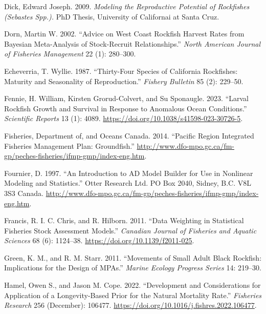 \documentclass[11pt,
  english,
  letterpaper,
]{article}
\newlength{\cslhangindent}
\newenvironment{CSLReferences}[2] %
 {%
  \setlength{\parindent}{0pt}
  \ifodd #1 \everypar{\setlength{\hangindent}{\cslhangindent}}\ignorespaces\fi
  \ifnum #2 > 0
  \setlength{\parskip}{#2\baselineskip}
  \fi
 }%
 {}
\begin{document}
\begin{CSLReferences}{1}{0}
\leavevmode{}%
Dick, Edward Joseph. 2009. \emph{Modeling the {Reproductive} {Potential} of {Rockfishes} (\emph{Sebastes} {Spp}.).} PhD Thesis, University of Californai at Santa Cruz.

\leavevmode{}%
Dorn, Martin W. 2002. {``Advice on {West} {Coast} Rockfish Harvest Rates from {B}ayesian Meta-Analysis of Stock-Recruit Relationships.''} \emph{North American Journal of Fisheries Management} 22 (1): 280--300.

\leavevmode{}%
Echeverria, T. Wyllie. 1987. {``Thirty-Four Species of California Rockfishes: Maturity and Seasonality of Reproduction.''} \emph{Fishery Bulletin} 85 (2): 229--50.

\leavevmode{}%
Fennie, H. William, Kirsten Grorud-Colvert, and Su Sponaugle. 2023. {``Larval Rockfish Growth and Survival in Response to Anomalous Ocean Conditions.''} \emph{Scientific Reports} 13 (1): 4089. \url{https://doi.org/10.1038/s41598-023-30726-5}.

\leavevmode{}%
Fisheries, Department of, and Oceans Canada. 2014. {``Pacific Region Integrated Fisheries Management Plan: Groundfish.''} \url{http://www.dfo-mpo.gc.ca/fm-gp/peches-fisheries/ifmp-gmp/index-eng.htm}.

\leavevmode{}%
Fournier, D. 1997. {``An Introduction to AD Model Builder for Use in Nonlinear Modeling and Statistics.''} Otter Research Ltd. PO Box 2040, Sidney, B.C. V8L 3S3 Canada. \url{http://www.dfo-mpo.gc.ca/fm-gp/peches-fisheries/ifmp-gmp/index-eng.htm}.

\leavevmode{}%
Francis, R. I. C. Chris, and R. Hilborn. 2011. {``Data Weighting in Statistical Fisheries Stock Assessment Models.''} \emph{Canadian Journal of Fisheries and Aquatic Sciences} 68 (6): 1124--38. \url{https://doi.org/10.1139/f2011-025}.

\leavevmode{}%
Green, K. M., and R. M. Starr. 2011. {``Movements of Small Adult Black Rockfish: Implications for the Design of MPAs.''} \emph{Marine Ecology Progress Series} 14: 219--30.

\leavevmode{}%
Hamel, Owen S., and Jason M. Cope. 2022. {``Development and Considerations for Application of a Longevity-Based Prior for the Natural Mortality Rate.''} \emph{Fisheries Research} 256 (December): 106477. \url{https://doi.org/10.1016/j.fishres.2022.106477}.


\end{CSLReferences}
\end{document}

